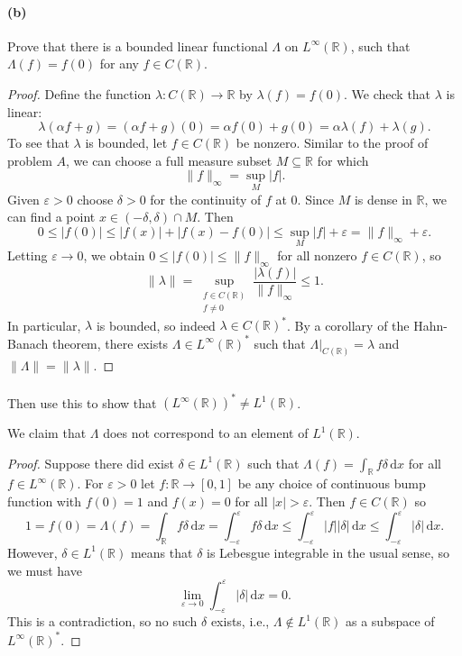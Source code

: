\documentclass[12pt]{article}
\newlength{\myparskip}
\newenvironment{fullbox}{\begin{lrbox}{\savefullbox}\begin{minipage}{\dimexpr\textwidth-2\fboxsep\relax}\setlength{\parskip}{\myparskip}}{\end{minipage}\end{lrbox}\framebox[\textwidth]{\usebox{\savefullbox}}}
\newenvironment{pbox}[1][]{\begin{fullbox}\def\temp{#1}\ifx\temp\empty\else\paragraph{#1}\phantom{}\fi}{\end{fullbox}}
\theoremstyle{definition}
\newcommand{\R}{\mathbb{R}}
\newcommand{\eps}{\varepsilon}
\newcommand{\<}{\langle}
\renewcommand{\>}{\rangle}
\newcommand{\seq}{\subseteq}
\newcommand{\dd}{\mathrm{d}}
\begin{document}
\newpage
\begin{pbox}[(b)]
    Prove that there is a bounded linear functional $\Lambda$ on $L^\infty(\R)$, such that $\Lambda(f) = f(0)$ for any $f \in C(\R)$.
\end{pbox}

\begin{proof}
    Define the function $\lambda : C(\R) \to \R$ by $\lambda(f) = f(0)$.
    We check that $\lambda$ is linear:
    \[
        \lambda(\alpha f + g)
            = (\alpha f + g)(0)
            = \alpha f(0) + g(0)
            = \alpha \lambda(f) + \lambda(g).
    \]
    To see that $\lambda$ is bounded, let $f \in C(\R)$ be nonzero.
    Similar to the proof of problem $A$, we can choose a full measure subset $M \seq \R$ for which
    \[
        \|f\|_\infty = \sup_{M}|f|.
    \]
    Given $\eps > 0$ choose $\delta > 0$ for the continuity of $f$ at $0$.
    Since $M$ is dense in $\R$, we can find a point $x \in (-\delta, \delta) \cap M$.
    Then
    \[
        0
            \leq |f(0)|
            \leq |f(x)| + |f(x) - f(0)| 
            \leq \sup_{M}|f| + \eps
            = \|f\|_\infty + \eps.
    \]
    Letting $\eps \to 0$, we obtain $0 \leq |f(0)| \leq \|f\|_\infty$ for all nonzero $f \in C(\R)$, so
    \[
        \|\lambda\|
            = \sup_{\substack{f \in C(\R) \\ f \ne 0}} \frac{|\lambda(f)|}{\|f\|_\infty}
            \leq 1.
    \]
    In particular, $\lambda$ is bounded, so indeed $\lambda \in C(\R)^*$.
    By a corollary of the Hahn-Banach theorem, there exists $\Lambda \in L^\infty(\R)^*$ such that $\Lambda|_{C(\R)} = \lambda$ and $\|\Lambda\| = \|\lambda\|$.
\end{proof}

\begin{pbox}
    Then use this to show that $(L^\infty(\R))^* \ne L^1(\R)$.
\end{pbox}

We claim that $\Lambda$ does not correspond to an element of $L^1(\R)$.

\begin{proof}
    Suppose there did exist $\delta \in L^1(\R)$ such that $\Lambda(f) = \int_{\R} f\delta \,\dd{x}$ for all $f \in L^\infty(\R)$.
    For $\eps > 0$ let $f : \R \to [0, 1]$ be any choice of continuous bump function with $f(0) = 1$ and $f(x) = 0$ for all $|x| > \eps$.
    Then $f \in C(\R)$ so
    \[
        1
            = f(0)
            = \Lambda(f)
            = \int_\R f\delta \,\dd{x}
            = \int_{-\eps}^{\eps} f\delta \,\dd{x} 
            \leq \int_{-\eps}^{\eps} |f||\delta| \,\dd{x}
            \leq \int_{-\eps}^{\eps} |\delta| \,\dd{x}.
    \]
    However, $\delta \in L^1(\R)$ means that $\delta$ is Lebesgue integrable in the usual sense, so we must have
    \[
        \lim_{\eps \to 0} \int_{-\eps}^{\eps} |\delta| \,\dd{x} = 0.
    \]
    This is a contradiction, so no such $\delta$ exists, i.e., $\Lambda \notin L^1(\R)$ as a subspace of $L^\infty(\R)^*$.
\end{proof}
\end{document}
